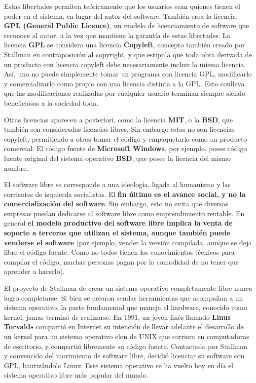  Estas libertades permiten teóricamente que los
usuarios sean quienes tienen el poder en el sistema, en lugar del autor del
software. También crea la licencia \textbf{GPL (General Public Licence)}, un
modelo de licenciamiento de software que reconoce al autor, a la vez que
mantiene la garantía de estas libertades. La licencia \textbf{GPL} se considera
una licencia \textbf{Copyleft}, concepto también creado por Stallman en
contraposición al copyright, y que estipula que toda obra derivada de un
producto con licencia copyleft debe necesariamente incluir la misma licencia.
Así, uno no puede simplemente tomar un programa con licencia GPL, modificarlo y
comercializarlo como propio con una licencia distinta a la GPL. Esto conlleva
que las modificaciones realizadas por cualquier usuario terminan siempre siendo
beneficiosas a la sociedad toda.

 Otras licencias aparecen a posteriori, como la licencia
\textbf{MIT}, o la \textbf{BSD}, que también son consideradas licencias libres.
Sin embargo estas no son licencias copyleft, permitiendo a otros tomar el código
y empaquetarlo como un producto comercial. El código fuente de \textbf{Microsoft
Windows}, por ejemplo, posee código fuente original del sistema operativo
\textbf{BSD}, que posee la licencia del mismo nombre.

El software libre se corresponde a una ideología, ligada al humanismo y las
corrientes de izquierda socialistas. El \textbf{fin último es el avance social,
y no la comercialización del software}. Sin embargo, esto no evita que diversas
empresas puedan dedicarse al software libre como emprendimiento rentable. En
general \textbf{el modelo productivo del software libre implica la venta de
soporte a terceros que utilizan el sistema, aunque también puede venderse el
software} (por ejemplo, vender la versión compilada, aunque se deja libre el
código fuente. Como no todos tienen los conocimientos técnicos para compilar el
código, muchas personas pagan por la comodidad de no tener que aprender a
hacerlo).

 El proyecto de Stallman de crear un sistema
operativo completamente libre nunca logro completarse. Si bien se crearon sendas
herramientas que acompañan a un sistema operativo, la parte fundamental que
maneja el hardware, conocido como kernel, jamas terminó de realizarse. En 1991,
un joven finés llamado \textbf{Linus Torvalds} compartió en Internet su
intención de llevar adelante el desarrollo de un kernel para un sistema
operativo clon de UNIX que corriera en computadoras de escritorio, y compartió
libremente su código fuente. Contactado por Stallman y convencido del movimiento
de software libre, decidió licenciar su software con GPL, bautizándolo Linux.
Este sistema operativo se ha vuelto hoy en día el sistema operativo libre más
popular del mundo.

